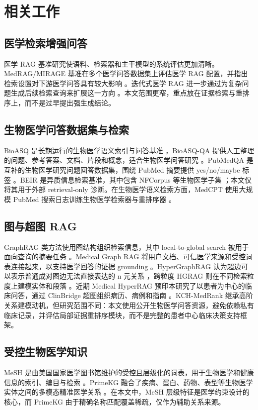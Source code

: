 \section{相关工作}

\subsection{医学检索增强问答}

医学 RAG 基准研究使语料、检索器和主干模型的系统评估更加清晰。MedRAG/MIRAGE 基准在多个医学问答数据集上评估医学 RAG 配置，并指出检索设置对下游医学问答具有较大影响 \citep{xiong2024benchmarking}。迭代式医学 RAG 进一步通过为复杂问题生成后续检索查询来扩展这一方向 \citep{xiong2024imedrag}。本文范围更窄，重点放在证据检索与重排序上，而不是过早提出强生成结论。

\subsection{生物医学问答数据集与检索}

BioASQ 是长期运行的生物医学语义索引与问答基准 \citep{tsatsaronis2015bioasq}，BioASQ-QA 提供人工整理的问题、参考答案、文档、片段和概念，适合生物医学问答研究 \citep{krithara2023bioasqqa}。PubMedQA 是互补的生物医学研究问题回答数据集，围绕 PubMed 摘要提供 yes/no/maybe 标签 \citep{jin2019pubmedqa}。BEIR 是异质信息检索基准，其中包含 NFCorpus 等生物医学子集 \citep{thakur2021beir}；本文仅将其用于外部 retrieval-only 诊断。在生物医学语义检索方面，MedCPT 使用大规模 PubMed 搜索日志训练生物医学检索器与重排序器 \citep{jin2023medcpt}。

\subsection{图与超图 RAG}

GraphRAG 类方法使用图结构组织检索信息，其中 local-to-global search 被用于面向查询的摘要任务 \citep{edge2024graphrag}。Medical Graph RAG 将用户文档、可信医学来源和受控词表连接起来，以支持医学回答的证据 grounding \citep{wu2024medgraphrag}。HyperGraphRAG 认为超边可以表示普通成对图边无法直接表达的 n 元关系 \citep{luo2025hypergraphrag}，跨粒度 HGRAG 则在不同检索粒度上建模实体和段落 \citep{wang2026hgrag}。近期 Medical HyperRAG 预印本研究了以患者为中心的临床问答，通过 ClinBridge 超图组织病历、病例和指南 \citep{xu2026medicalhyperrag}。KCH-MedRank 继承高阶关系建模动机，但研究范围不同：本文使用公开生物医学问答资源，避免依赖私有临床记录，并评估局部证据重排序模块，而不是完整的患者中心临床决策支持框架。

\subsection{受控生物医学知识}

MeSH 是由美国国家医学图书馆维护的受控且层级化的词表，用于生物医学和健康信息的索引、编目与检索 \citep{nlm2026mesh}。PrimeKG 融合了疾病、蛋白、药物、表型等生物医学实体之间的多模态精准医学关系 \citep{chandak2023primekg}。在本文中，MeSH 层级特征是医学约束设计的核心，而 PrimeKG 由于精确名称匹配覆盖稀疏，仅作为辅助关系来源。
